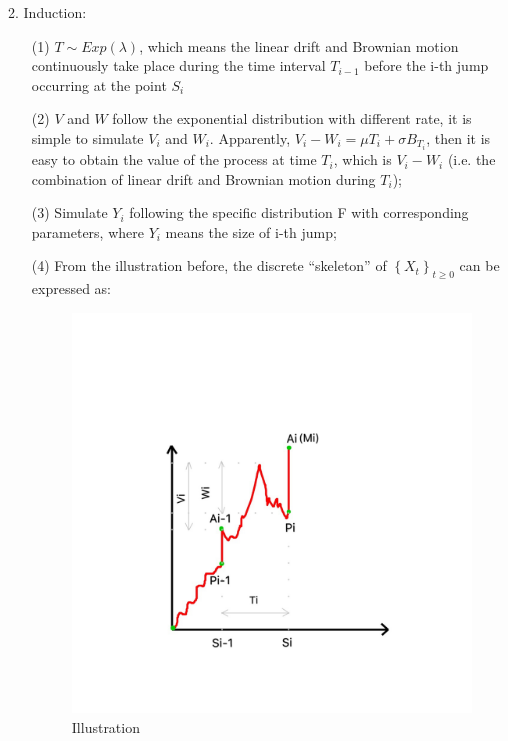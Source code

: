 2. Induction:
\begin{enumerate}
    \item[(1)] $T \sim E x p(\lambda)$, which means
    the linear drift and Brownian motion continuously take place during the time interval $T_{i-1}$ before the i-th jump occurring at the point $S_{i}$
    \item[(2)] $V$ and $W$ follow the exponential distribution with different rate, it is simple to simulate $V_{i}$ and $W_{i}$. Apparently, $V_{i}-W_{i} = \mu T_{i}+\sigma B_{{T}_{i}}$, then it is easy to obtain the value of the process at time $T_{i}$, which is $V_{i}-W_{i}$ (i.e. the combination of linear drift and Brownian motion during $T_{i}$);
    \item[(3)] Simulate $Y_{i}$ following the specific distribution F with corresponding parameters, where $Y_{i}$ means the size of i-th jump;
    \item[(4)] From the illustration before, the discrete ``skeleton'' of $\left\{X_{t}\right\}_{t \geq 0}$ can be expressed as:
    
    \begin{figure}[H]
    \centering
    \includegraphics[scale=0.25]{figures/Illustration.png}
    \caption{Illustration}
    \label{fig:my_label}
\end{figure}
    

\end{enumerate}
